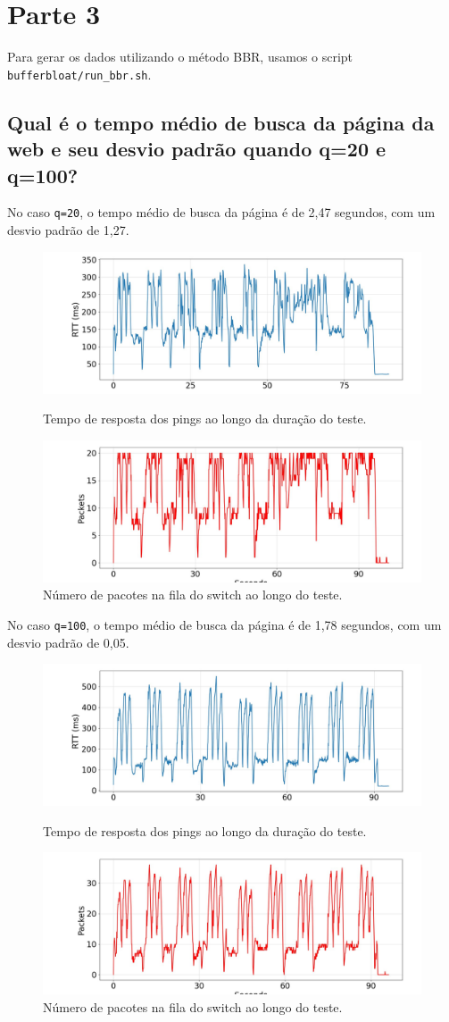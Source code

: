 \documentclass[a4paper,12pt]{article}
\newcommand{\code}[1]{\texttt{#1}}
\begin{document}
\section{Parte 3}

Para gerar os dados utilizando o método BBR, usamos o script \code{bufferbloat/run\_bbr.sh}.

\subsection{Qual é o tempo médio de busca da página da web e seu desvio padrão quando q=20 e q=100?}
No caso \code{q=20}, o tempo médio de busca da página é de 2,47 segundos, com um desvio padrão de 1,27.

\begin{figure}[h!]
  \centering
  \includegraphics[width=0.7\columnwidth]{./bufferbloat/bb-q20/bbr-rtt.jpg}
  \caption{Tempo de resposta dos pings ao longo da duração do teste.}
  \includegraphics[width=0.7\columnwidth]{./bufferbloat/bb-q20/bbr-buffer.jpg}
  \caption{Número de pacotes na fila do switch ao longo do teste.}
\end{figure}

\newpage

No caso \code{q=100}, o tempo médio de busca da página é de 1,78 segundos, com um desvio padrão de 0,05.

\begin{figure}[h!]
  \centering
  \includegraphics[width=0.7\columnwidth]{./bufferbloat/bb-q100/bbr-rtt.jpg}
  \caption{Tempo de resposta dos pings ao longo da duração do teste.}
  \includegraphics[width=0.7\columnwidth]{./bufferbloat/bb-q100/bbr-buffer.jpg}
  \caption{Número de pacotes na fila do switch ao longo do teste.}
\end{figure}
\end{document}
